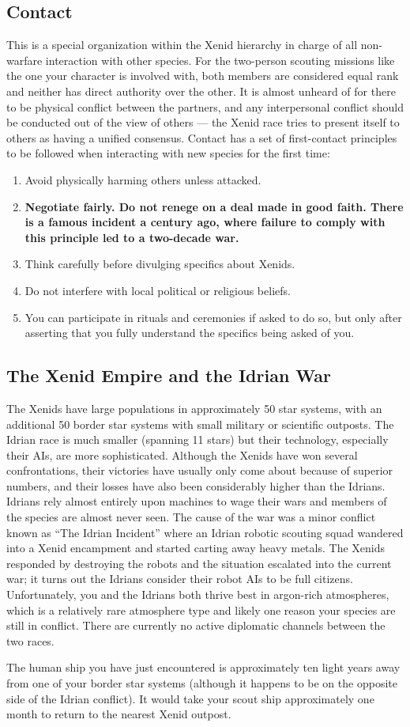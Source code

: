 \documentclass[blue]{guildcamp1}
\begin{document}
\subsection*{Contact}

This is a special organization within the Xenid hierarchy in charge of all non-warfare interaction with other species. For the two-person scouting missions like the one your character is involved with, both members are considered equal rank and neither has direct authority over the other. It is almost unheard of for there to be physical conflict between the partners, and any interpersonal conflict should be conducted out of the view of others --- the Xenid race tries to present itself to others as having a unified consensus. Contact has a set of first-contact principles to be followed when interacting with new species for the first time:

\begin{enumerate}
\item Avoid physically harming others unless attacked.
\item \textbf{Negotiate fairly. Do not renege on a deal made in good faith. There is a famous incident a century ago, where failure to comply with this principle led to a two-decade war.}
\item Think carefully before divulging specifics about Xenids.
\item Do not interfere with local political or religious beliefs.
\item You can participate in rituals and ceremonies if asked to do so, but only after asserting that you fully understand the specifics being asked of you.
\end{enumerate}
 
\subsection*{The Xenid Empire and the Idrian War}

The Xenids have large populations in approximately 50 star systems, with an additional 50 border star systems with small military or scientific outposts. The Idrian race is much smaller (spanning 11 stars) but their technology, especially their AIs, are more sophisticated. Although the Xenids have won several confrontations, their victories have usually only come about because of superior numbers, and their losses have also been considerably higher than the Idrians. Idrians rely almost entirely upon machines to wage their wars and members of the species are almost never seen. The cause of the war was a minor conflict known as ``The Idrian Incident'' where an Idrian robotic scouting squad wandered into a Xenid encampment and started carting away heavy metals. The Xenids responded by destroying the robots and the situation escalated into the current war; it turns out the Idrians consider their robot AIs to be full citizens. Unfortunately, you and the Idrians both thrive best in argon-rich atmospheres, which is a relatively rare atmosphere type and likely one reason your species are still in conflict. There are currently no active diplomatic channels between the two races.

The human ship you have just encountered is approximately ten light years away from one of your border star systems (although it happens to be on the opposite side of the Idrian conflict). It would take your scout ship approximately one month to return to the nearest Xenid outpost.
\end{document}
